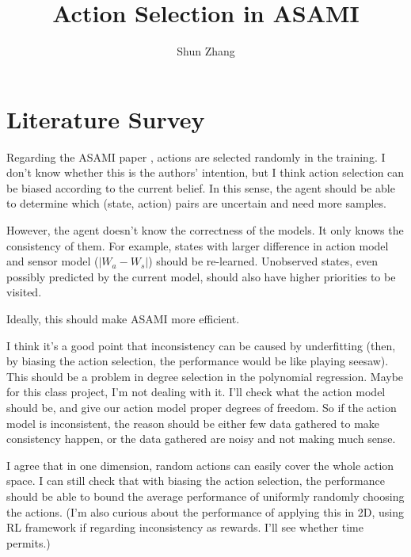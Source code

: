 \documentclass[10pt]{article}
\title{Action Selection in ASAMI}
\author{Shun Zhang}
\date{}
\begin{document}
\maketitle

\begin{abstract}
\end{abstract}

\sloppy
\section{Literature Survey}

Regarding the ASAMI paper \cite{CSJ06}, actions are selected randomly
in the training. I don't know whether this is the authors' intention,
but I think action selection can be biased according to the current
belief.  In this sense, the agent should be able to determine which
(state, action) pairs are uncertain and need more samples.

However, the agent doesn't know the correctness of the models. It only
knows the consistency of them. For example, states with larger
difference in action model and sensor model ($|W_a - W_s|$) should be
re-learned.  Unobserved states, even possibly predicted by the current
model, should also have higher priorities to be visited.

Ideally, this should make ASAMI more efficient.

I think it's a good point that inconsistency can be caused by
underfitting (then, by biasing the action selection, the performance
would be like playing seesaw). This should be a problem in degree
selection in the polynomial regression. Maybe for this class project,
I'm not dealing with it. I'll check what the action model should be,
and give our action model proper degrees of freedom. So if the action
model is inconsistent, the reason should be either few data gathered
to make consistency happen, or the data gathered are noisy and not
making much sense.

I agree that in one dimension, random actions can easily cover the
whole action space. I can still check that with biasing the action
selection, the performance should be able to bound the average
performance of uniformly randomly choosing the actions. (I'm also
curious about the performance of applying this in 2D, using RL
framework if regarding inconsistency as rewards.  I'll see whether
time permits.)




\end{document}
